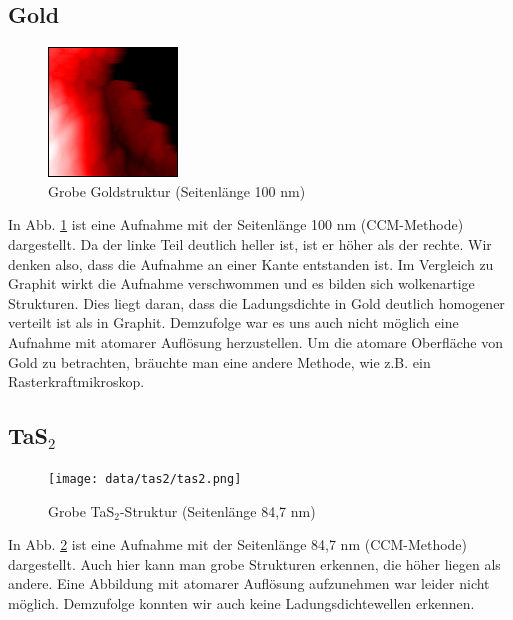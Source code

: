 \subsection{Gold}
\begin{figure}[h]
\centering
\includegraphics[scale=1]{data/gold/raw.png}
\caption{Grobe Goldstruktur (Seitenlänge 100 nm)}
\label{fig:gold}
\end{figure}
In Abb. \ref{fig:gold} ist eine Aufnahme mit der Seitenlänge 100 nm (CCM-Methode) dargestellt.  Da der linke Teil deutlich heller ist, ist er höher als der rechte. Wir denken also, dass die Aufnahme an einer Kante entstanden ist. Im Vergleich zu Graphit wirkt die Aufnahme verschwommen und es bilden sich wolkenartige Strukturen. Dies liegt daran, dass die Ladungsdichte in Gold deutlich homogener verteilt ist als in Graphit. Demzufolge war es uns auch nicht möglich eine Aufnahme mit atomarer Auflösung herzustellen. Um die atomare Oberfläche von Gold zu betrachten, bräuchte man eine andere Methode, wie z.B. ein Rasterkraftmikroskop.

\subsection{TaS$_2$}
\begin{figure}[h]
\centering
\texttt{[image: data/tas2/tas2.png]}
\caption{Grobe TaS$_2$-Struktur (Seitenlänge 84,7 nm)}
\label{fig:tas2}
\end{figure}
In Abb. \ref{fig:tas2} ist eine Aufnahme mit der Seitenlänge 84,7 nm (CCM-Methode) dargestellt. Auch hier kann man grobe Strukturen erkennen, die höher liegen als andere. Eine Abbildung mit atomarer Auflösung aufzunehmen war leider nicht möglich. Demzufolge konnten wir auch keine Ladungsdichtewellen erkennen. 

